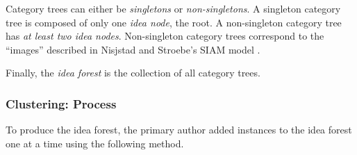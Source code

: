 Category trees can either be \emph{singletons} or \emph{non-singletons}. A singleton category tree is composed of only one \emph{idea node}, the root. A non-singleton category tree has \emph{at least two idea nodes}. Non-singleton category trees correspond to the ``images'' described in Nisjstad and Stroebe's SIAM model \cite{nijstad_how_2006}.

Finally, the \emph{idea forest} is the collection of all category trees.





\subsubsection{Clustering: Process}
To produce the idea forest, the primary author added instances to the idea forest one at a time using the following method.

